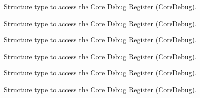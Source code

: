 \begin{DoxyRefList}
\label{deprecated__deprecated000104}%
%
Structure type to access the Core Debug Register (Core\+Debug). 

\label{deprecated__deprecated000158}%
%
Structure type to access the Core Debug Register (Core\+Debug). 

\label{deprecated__deprecated000243}%
%
Structure type to access the Core Debug Register (Core\+Debug). 

\label{deprecated__deprecated000300}%
%
Structure type to access the Core Debug Register (Core\+Debug). 

\label{deprecated__deprecated000376}%
%
Structure type to access the Core Debug Register (Core\+Debug). 

\label{deprecated__deprecated000455}%
%
Structure type to access the Core Debug Register (Core\+Debug). 
\end{DoxyRefList}